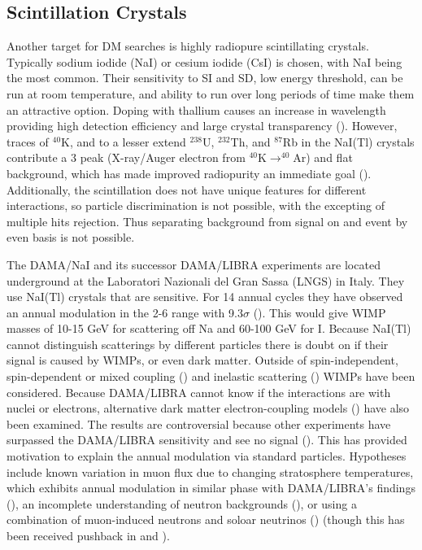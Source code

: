 \subsection{Scintillation Crystals} \label{subsec:crystals}
Another target for DM searches is highly radiopure scintillating crystals.  Typically sodium iodide (NaI) or cesium iodide (CsI) is chosen,
with NaI being the most common.  Their sensitivity to SI and SD, low energy threshold, can be run at room temperature,
and ability to run over long periods of time
make them an attractive option.  Doping with thallium causes an increase in wavelength providing high detection efficiency and large
crystal transparency ().  However, traces of $^{40}$K, and to a lesser extend $^{238}$U, $^{232}$Th,
and $^{87}$Rb in the NaI(Tl) crystals contribute a 3 \kevee peak (X-ray/Auger electron from $^{40}\mathrm{K} \rightarrow ^{40}\mathrm{Ar}$)
and flat background, which has made improved radiopurity an immediate goal ().  Additionally, the scintillation
does not have unique features for different interactions, so particle discrimination is not possible, with the excepting of
multiple hits rejection.  Thus separating background from signal on and event by even basis is not possible.

The DAMA/NaI and its successor DAMA/LIBRA experiments are located underground at the Laboratori Nazionali del Gran Sassa (LNGS) in
Italy.  They use NaI(Tl) crystals that are sensitive.  For 14 annual cycles they have observed an annual modulation in the 2-6 \kevee
range with 9.3$\sigma$ ().  This would give WIMP masses of 10-15 GeV for scattering off Na
and 60-100 GeV for I.  Because NaI(Tl) cannot distinguish scatterings by different particles there is doubt on if their signal
is caused by WIMPs, or even dark matter.  Outside of spin-independent, spin-dependent or mixed coupling ()
and inelastic scattering () WIMPs 
have been considered.  Because DAMA/LIBRA cannot know if the interactions are with nuclei or electrons, alternative dark matter
electron-coupling models () have also been examined.  The results are controversial because other experiments
have surpassed the DAMA/LIBRA sensitivity and see no signal ().  This has provided motivation to explain the annual modulation via
standard particles.  Hypotheses include known variation in muon flux due to changing stratosphere temperatures, which exhibits
annual modulation in similar phase with DAMA/LIBRA's findings (), an incomplete understanding of neutron backgrounds
(), or using a combination of muon-induced neutrons and soloar neutrinos () (though this
has been received pushback in  and ).


